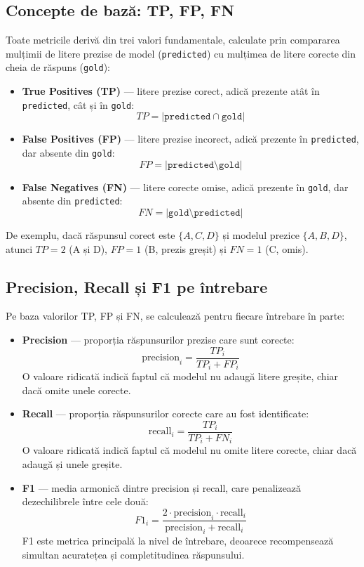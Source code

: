 \documentclass[12pt, a4paper, oneside, romanian]{teza-upb}
\begin{document}
\subsection{Concepte de bază: TP, FP, FN}

Toate metricile derivă din trei valori fundamentale, calculate prin compararea mulțimii de litere prezise de model (\texttt{predicted}) cu mulțimea de litere corecte din cheia de răspuns (\texttt{gold}):

\begin{itemize}
    \item \textbf{True Positives (TP)} --- litere prezise corect, adică prezente atât în \texttt{predicted}, cât și în \texttt{gold}:
    \[ TP = |\texttt{predicted} \cap \texttt{gold}| \]

    \item \textbf{False Positives (FP)} --- litere prezise incorect, adică prezente în \texttt{predicted}, dar absente din \texttt{gold}:
    \[ FP = |\texttt{predicted} \setminus \texttt{gold}| \]

    \item \textbf{False Negatives (FN)} --- litere corecte omise, adică prezente în \texttt{gold}, dar absente din \texttt{predicted}:
    \[ FN = |\texttt{gold} \setminus \texttt{predicted}| \]
\end{itemize}

De exemplu, dacă răspunsul corect este $\{A, C, D\}$ și modelul prezice $\{A, B, D\}$, atunci $TP = 2$ (A și D), $FP = 1$ (B, prezis greșit) și $FN = 1$ (C, omis).

\subsection{Precision, Recall și F1 pe întrebare}

Pe baza valorilor TP, FP și FN, se calculează pentru fiecare întrebare în parte:

\begin{itemize}
    \item \textbf{Precision} --- proporția răspunsurilor prezise care sunt corecte:
    \[ \text{precision}_i = \frac{TP_i}{TP_i + FP_i} \]
    O valoare ridicată indică faptul că modelul nu adaugă litere greșite, chiar dacă omite unele corecte.

    \item \textbf{Recall} --- proporția răspunsurilor corecte care au fost identificate:
    \[ \text{recall}_i = \frac{TP_i}{TP_i + FN_i} \]
    O valoare ridicată indică faptul că modelul nu omite litere corecte, chiar dacă adaugă și unele greșite.

    \item \textbf{F1} --- media armonică dintre precision și recall, care penalizează dezechilibrele între cele două:
    \[ F1_i = \frac{2 \cdot \text{precision}_i \cdot \text{recall}_i}{\text{precision}_i + \text{recall}_i} \]
    F1 este metrica principală la nivel de întrebare, deoarece recompensează simultan acuratețea și completitudinea răspunsului.
\end{itemize}
\end{document}
